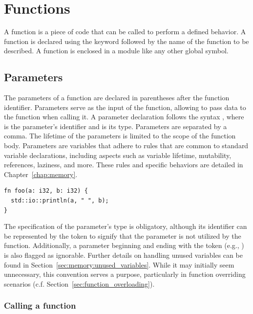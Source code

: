 \section{Functions}%
\label{sec:global:functions}

A function is a piece of code that can be called to perform a defined behavior.
A function is declared using the keyword  followed by the name of the
function to be described. A function is enclosed in a module like any other
global symbol.

\subsection{Parameters}
\label{sec:global:function_parameters}

The parameters of a function are declared in parentheses after the function
identifier. Parameters serve as the input of the function, allowing to pass data
to the function when calling it. A parameter declaration follows the syntax
, where  is the parameter's identifier and
 is its type. Parameters are separated by a comma. The lifetime of the
parameters is limited to the scope of the function body. Parameters are
variables that adhere to rules that are common to standard variable
declarations, including aspects such as variable lifetime, mutability,
references, laziness, and more. These rules and specific behaviors are detailed
in Chapter~\ref{chap:memory}.

\begin{lstlisting}[style=coloredverbatim]
fn foo(a: i32, b: i32) {
  std::io::println(a, " ", b);
}
\end{lstlisting}

The specification of the parameter's type is obligatory, although its identifier
can be represented by the token \token{\_} to signify that the parameter is not
utilized by the function. Additionally, a parameter beginning and ending with
the token \token{\_} (e.g., ) is also flagged as ignorable. Further
details on handling unused variables can be found in
Section~\ref{sec:memory:unused_variables}. While it may initially seem unnecessary,
this convention serves a purpose, particularly in function overriding scenarios
(c.f. Section~\ref{sec:function_overloading}).

\subsubsection*{Calling a function}


